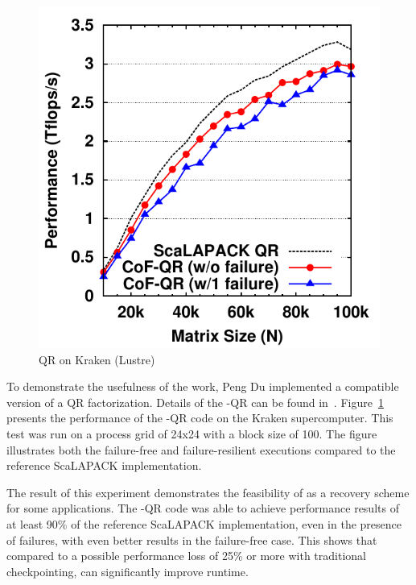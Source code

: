 \begin{figure}
    \centering
    \begin{minipage}{.73\linewidth}
        \includegraphics[width=\linewidth]{figures/kraken-new-data}
        \caption{\cof QR on Kraken (Lustre)}
        \label{fig:cof-kraken}
    \end{minipage}
\end{figure}

To demonstrate the usefulness of the \cof work, Peng Du implemented a \cof
compatible version of a QR factorization. Details of the \cof-QR can be found
in~\cite{Bland:2012tw}. Figure~\ref{fig:cof-kraken} presents the performance of
the \cof-QR code on the Kraken supercomputer. This test was run on a process
grid of 24x24 with a block size of 100. The figure illustrates both the
failure-free and failure-resilient executions compared to the reference
ScaLAPACK implementation.

The result of this experiment demonstrates the feasibility of \cof as a recovery
scheme for some \abft applications. The \cof-QR code was able to achieve
performance results of at least 90\% of the reference ScaLAPACK implementation,
even in the presence of failures, with even better results in the failure-free
case. This shows that compared to a possible performance loss of 25\% or more
with traditional checkpointing, \cof can significantly improve runtime.


